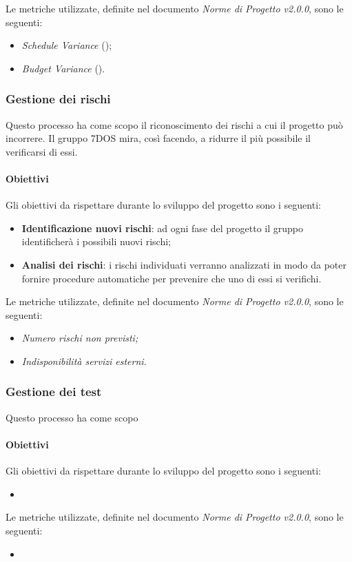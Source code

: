 Le metriche utilizzate, definite nel documento \emph{Norme di Progetto v2.0.0}, sono le seguenti:
\begin{itemize}
			\item{\emph{Schedule Variance} ();}
			\item{\emph{Budget Variance} ().}
\end{itemize}

\subsubsection{Gestione dei rischi}
Questo processo ha come scopo il riconoscimento dei rischi a cui il progetto può incorrere. Il gruppo 7DOS mira, così facendo, a ridurre il più possibile il verificarsi di essi.
\paragraph{Obiettivi} \Spazio
Gli obiettivi da rispettare durante lo sviluppo del progetto sono i seguenti:
\begin{itemize}
	\item{\textbf{Identificazione nuovi rischi}: ad ogni fase del progetto il gruppo identificherà i possibili nuovi rischi;}
	\item{\textbf{Analisi dei rischi}: i rischi individuati verranno analizzati in modo da poter fornire procedure automatiche per prevenire che uno di essi si verifichi.}
\end{itemize}
Le metriche utilizzate, definite nel documento \emph{Norme di Progetto v2.0.0}, sono le seguenti:
\begin{itemize}
	\item\emph{Numero rischi non previsti;}
	\item\emph{Indisponibilità servizi esterni.}
\end{itemize}

\subsubsection{Gestione dei test}
Questo processo ha come scopo
\paragraph{Obiettivi} \Spazio
Gli obiettivi da rispettare durante lo sviluppo del progetto sono i seguenti:
\begin{itemize}
	\item{}
\end{itemize}
Le metriche utilizzate, definite nel documento \emph{Norme di Progetto v2.0.0}, sono le seguenti:
\begin{itemize}
	\item{}
\end{itemize}

